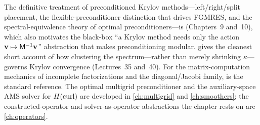 \furtherreading
The definitive treatment of preconditioned Krylov methods---left/right/split placement, the
flexible-preconditioner distinction that drives FGMRES, and the spectral-equivalence theory of
optimal preconditioners---is \citet{saad2003} (Chapters~9 and~10), which also motivates the
black-box ``a Krylov method needs only the action $\mathbf{v}\mapsto\mathsf{M}^{-1}\mathbf{v}$'' abstraction
that makes preconditioning modular. \citet{trefethenbau1997} gives the cleanest short account
of how clustering the spectrum---rather than merely shrinking $\kappa$---governs Krylov
convergence (Lectures~35 and~40). For the matrix-computation mechanics of incomplete
factorizations and the diagonal/Jacobi family, \citet{golubvanloan2013} is the standard
reference. The optimal multigrid preconditioner and the auxiliary-space AMS solver for
$H(\mathrm{curl})$ are developed in \cref{ch:multigrid} and \cref{ch:smoothers}; the constructed-operator
and solver-as-operator abstractions the chapter rests on are \cref{ch:operators}.

